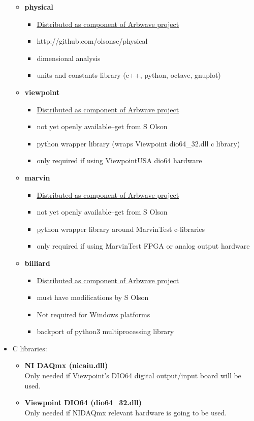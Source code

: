 \begin{itemize}
\begin{itemize}
      \item \textbf{physical}
        \begin{itemize}
          \item \underline{Distributed as component of Arbwave project}
          \item http://github.com/olsonse/physical
          \item dimensional analysis
          \item units and constants library (c++, python, octave, gnuplot)
        \end{itemize}

      \item \textbf{viewpoint}
        \begin{itemize}
          \item \underline{Distributed as component of Arbwave project}
          \item not yet openly available--get from S Olson
          \item python wrapper library (wraps Viewpoint dio64\_32.dll c library)
          \item only required if using ViewpointUSA dio64 hardware
        \end{itemize}

      \item \textbf{marvin}
        \begin{itemize}
          \item \underline{Distributed as component of Arbwave project}
          \item not yet openly available--get from S Olson
          \item python wrapper library around MarvinTest c-libraries
          \item only required if using MarvinTest FPGA or analog output hardware
        \end{itemize}

      \item \textbf{billiard}
        \begin{itemize}
          \item \underline{Distributed as component of Arbwave project}
          \item must have modifications by S Olson
          \item Not required for Windows platforms
          \item backport of python3 multiprocessing library
        \end{itemize}
    \end{itemize}

  \item C libraries:
    \begin{itemize}
    \item \textbf{NI DAQmx (nicaiu.dll)} \\
      Only needed if Viewpoint's DIO64 digital output/input board will be used.
    \item \textbf{Viewpoint DIO64 (dio64\_32.dll)} \\
      Only needed if NIDAQmx relevant hardware is going to be used.
    \end{itemize}
\end{itemize}

